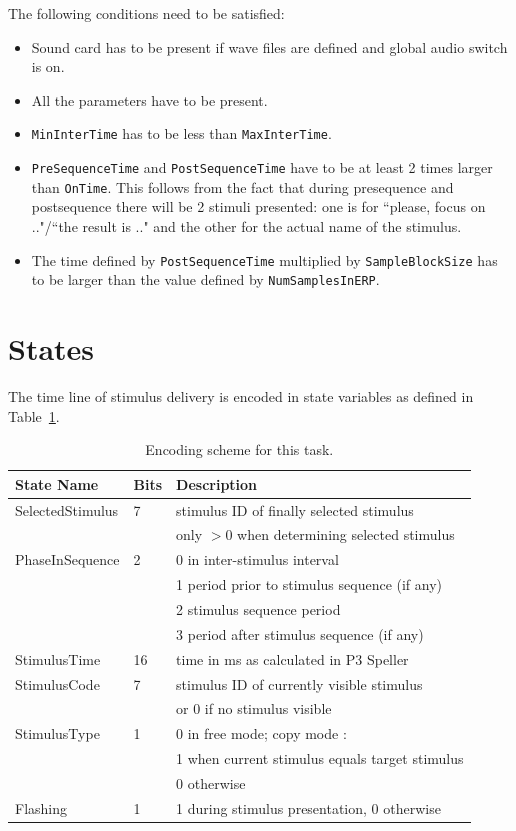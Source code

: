 \documentclass[letterpaper,oneside,12pt]{article}
\begin{document}
The following conditions need to be satisfied: 
\begin{itemize}
  \item Sound card has to be present if wave files are defined and global audio switch is on.
  \item All the parameters have to be present.
  \item {\tt MinInterTime} has to be less than {\tt MaxInterTime}.
  \item {\tt PreSequenceTime} and {\tt PostSequenceTime} have to be at least 2 times larger than {\tt OnTime}. This follows from the fact
  	that during presequence and postsequence there will be 2 stimuli presented: one is for ``please, focus on .."/``the result is .." and the
  	other for the actual name of the stimulus.		
  \item The time defined by {\tt PostSequenceTime} multiplied by {\tt SampleBlockSize} has to be larger than the value defined by {\tt NumSamplesInERP}.
\end{itemize}



\section{States}

The time line of stimulus delivery is encoded in state variables as defined in
Table~\ref{tab:states}.
\begin{table}
\begin{center}
\begin{tabular}[ht]{|l|l|l|}
\hline
\bf{State Name}& \bf{Bits}            & \bf{Description} \\
\hline
\hline
 SelectedStimulus & 7 & stimulus ID of finally selected stimulus \\
                  &   & only $>$0 when determining selected stimulus\\
\hline
 PhaseInSequence  & 2 & 0 in inter-stimulus interval\\
                  &   & 1 period prior to stimulus sequence (if any)\\
                  &   & 2 stimulus sequence period\\
                  &   & 3 period after stimulus sequence (if any)\\
\hline
 StimulusTime     & 16& time in ms as calculated in P3 Speller\\
\hline
 StimulusCode     & 7 & stimulus ID of currently visible stimulus\\
                  &   & or 0 if no stimulus visible\\
\hline
 StimulusType     & 1 & 0 in free mode; copy mode :\\
                  &   & 1 when current stimulus equals target stimulus\\
                  &   & 0 otherwise\\
\hline
 Flashing         & 1 & 1 during stimulus presentation, 0 otherwise\\
\hline
\end{tabular}
\caption{Encoding scheme for this task.}
\label{tab:states}
\end{center}
\end{table}
\end{document}
